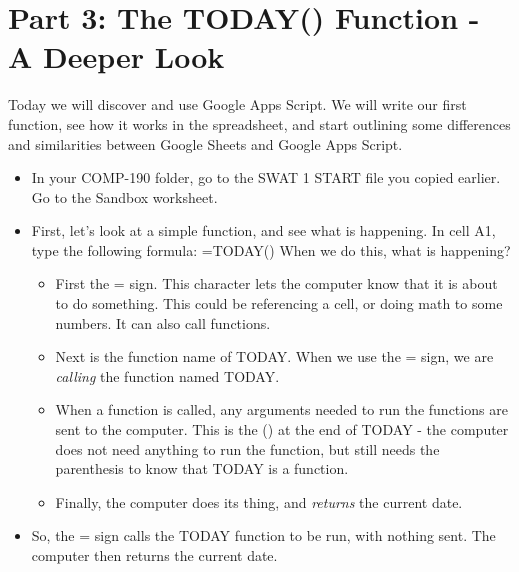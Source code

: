 \documentclass{article}
\begin{document}
\section*{Part 3: The TODAY() Function - A Deeper Look}
Today we will discover and use Google Apps Script.  We will write our first function, see how it works in the spreadsheet, and start outlining some differences and similarities between Google Sheets and Google Apps Script.
\begin{itemize}
	\item In your COMP-190 folder, go to the SWAT 1 START file you copied earlier.  Go to the Sandbox worksheet.
	\item First, let's look at a simple function, and see what is happening.  In cell A1, type the following formula:  =TODAY()  When we do this, what is happening?
		\begin{itemize}
			\item First the = sign.  This character lets the computer know that it is about to do something.  This could be referencing a cell, or doing math to some numbers.  It can also call functions.
			\item Next is the function name of TODAY.  When we use the = sign, we are \textit{calling} the function named TODAY.
			\item When a function is called, any arguments needed to run the functions are sent to the computer.  This is the () at the end of TODAY - the computer does not need anything to run the function, but still needs the parenthesis to know that TODAY is a function.
			\item Finally, the computer does its thing, and \textit{returns} the current date.  
		\end{itemize}
	\item So, the = sign calls the TODAY function to be run, with nothing sent.  The computer then returns the current date.
\end{itemize}
\end{document}
